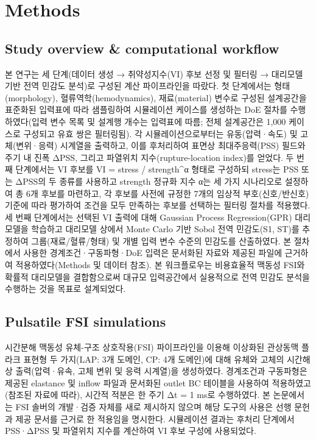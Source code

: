 \documentclass[preprint,12pt]{elsarticle}
\begin{document}
\section{Methods}

\subsection{Study overview \& computational workflow}
본 연구는 세 단계(데이터 생성 → 취약성지수(VI) 후보 선정 및 필터링 → 대리모델 기반 전역 민감도 분석)로 구성된 계산 파이프라인을 따랐다. 첫 단계에서는 형태(morphology), 혈류역학(hemodynamics), 재료(material) 변수로 구성된 설계공간을 표준화된 입력표에 따라 샘플링하여 시뮬레이션 케이스를 생성하는 DoE 절차를 수행하였다(입력 변수 목록 및 설계행 개수는 입력표에 따름; 전체 설계공간은 1,000 케이스로 구성되고 유효 쌍은 필터링됨). 각 시뮬레이션으로부터는 유동(압력·속도) 및 고체(변위·응력) 시계열을 출력하고, 이를 후처리하여 표면상 최대주응력(PSS) 필드와 주기 내 진폭 ΔPSS, 그리고 파열위치 지수(rupture-location index)를 얻었다. 두 번째 단계에서는 VI 후보를 VI = stress / strength\textasciicircum α 형태로 구성하되 stress는 PSS 또는 ΔPSS의 두 종류를 사용하고 strength 정규화 지수 α는 세 가지 시나리오로 설정하여 총 6개 후보를 마련하고, 각 후보를 사전에 규정한 7개의 임상적 부호(신호/반신호) 기준에 따라 평가하여 조건을 모두 만족하는 후보를 선택하는 필터링 절차를 적용했다. 세 번째 단계에서는 선택된 VI 출력에 대해 Gaussian Process Regression(GPR) 대리모델을 학습하고 대리모델 상에서 Monte Carlo 기반 Sobol 전역 민감도(S1, ST)를 추정하여 그룹(재료/혈류/형태) 및 개별 입력 변수 수준의 민감도를 산출하였다. 본 절차에서 사용한 경계조건·구동파형·DoE 입력은 문서화된 자료와 제공된 파일에 근거하여 적용하였다(Methods 및 데이터 참조). 본 워크플로우는 비용효율적 맥동성 FSI와 확률적 대리모델을 결합함으로써 대규모 입력공간에서 실용적으로 전역 민감도 분석을 수행하는 것을 목표로 설계되었다.

\subsection{Pulsatile FSI simulations}
시간분해 맥동성 유체-구조 상호작용(FSI) 파이프라인을 이용해 이상화된 관상동맥 플라크 표현형 두 가지(LAP: 3개 도메인, CP: 4개 도메인)에 대해 유체와 고체의 시간해상 출력(압력·유속, 고체 변위 및 응력 시계열)을 생성하였다. 경계조건과 구동파형은 제공된 elastance 및 inflow 파일과 문서화된 outlet BC 테이블을 사용하여 적용하였고(참조된 자료에 따라), 시간적 적분은 한 주기 Δt = 1 ms로 수행하였다. 본 논문에서는 FSI 솔버의 개발·검증 자체를 새로 제시하지 않으며 해당 도구의 사용은 선행 문헌과 제공 문서를 근거로 한 적용임을 명시한다. 시뮬레이션 결과는 후처리 단계에서 PSS·ΔPSS 및 파열위치 지수를 계산하여 VI 후보 구성에 사용되었다.
\end{document}
